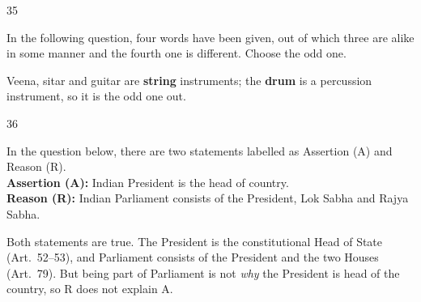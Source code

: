 \begin{question}{35}
{In the following question, four words have been given, out of which three are alike in some manner and the fourth one is different. Choose the odd one.\par}
\begin{explain}
Veena, sitar and guitar are \textbf{string} instruments; the \textbf{drum} is a percussion instrument, so it is the odd one out.
\end{explain}
\end{question}

\begin{question}{36}
{In the question below, there are two statements labelled as Assertion (A) and Reason (R).\\
\textbf{Assertion (A):} Indian President is the head of country.\\
\textbf{Reason (R):} Indian Parliament consists of the President, Lok Sabha and Rajya Sabha.\par}
\begin{explain}
Both statements are true. The President is the constitutional Head of State (Art.~52--53), and Parliament consists of the President and the two Houses (Art.~79). But being part of Parliament is not \emph{why} the President is head of the country, so R does not explain A.
\end{explain}
\end{question}

